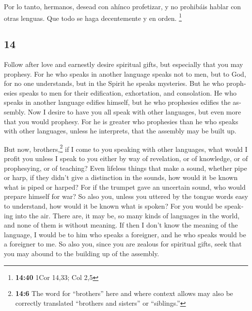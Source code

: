 \begin{paracol}{2}
 Por lo tanto, hermanos, desead con ahínco profetizar, y
no prohibáis hablar con otras lenguas.  Que todo se haga
decentemente y en orden. \footnote{\textbf{14:40} 1Cor 14,33; Col 2,5}

\switchcolumn
\begin{otherlanguage}{english}

\hypertarget{section-27}{%
\section{14}\label{section-27}}

 Follow after love and earnestly desire spiritual gifts,
but especially that you may prophesy.  For he who speaks
in another language speaks not to men, but to God, for no one
understands, but in the Spirit he speaks mysteries.  But
he who prophesies speaks to men for their edification, exhortation, and
consolation.  He who speaks in another language edifies
himself, but he who prophesies edifies the assembly.  Now
I desire to have you all speak with other languages, but even more that
you would prophesy. For he is greater who prophesies than he who speaks
with other languages, unless he interprets, that the assembly may be
built up.

 But now, brothers,\footnote{\textbf{14:6} The word for
  ``brothers'' here and where context allows may also be correctly
  translated ``brothers and sisters'' or ``siblings.''} if I come to you
speaking with other languages, what would I profit you unless I speak to
you either by way of revelation, or of knowledge, or of prophesying, or
of teaching?  Even lifeless things that make a sound,
whether pipe or harp, if they didn't give a distinction in the sounds,
how would it be known what is piped or harped?  For if the
trumpet gave an uncertain sound, who would prepare himself for war?
 So also you, unless you uttered by the tongue words easy
to understand, how would it be known what is spoken? For you would be
speaking into the air.  There are, it may be, so many
kinds of languages in the world, and none of them is without meaning.
 If then I don't know the meaning of the language, I
would be to him who speaks a foreigner, and he who speaks would be a
foreigner to me.  So also you, since you are zealous for
spiritual gifts, seek that you may abound to the building up of the
assembly.


\end{otherlanguage}
\end{paracol}

